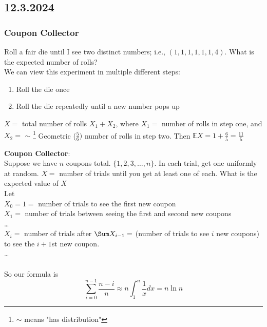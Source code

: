 \documentclass[11pt]{scrartcl}
\begin{document}
\subsection{12.3.2024}
\subsubsection{Coupon Collector}
\begin{example}
    Roll a fair die until I see two distinct numbers; i.e., $(1, 1, 1, 1, 1, 1, 4)$. What is the expected number of rolls? \\
    \noindent
    We can view this experiment in multiple different steps: \begin{enumerate}
        \item Roll the die once
        \item Roll the die repeatedly until a new number pops up
    \end{enumerate}
    $X = $ total number of rolls $ X_1 + X_2$, where $X_1=$ number of rolls in step one, and $X_2= $ $\sim$ \footnote{$\sim$ means "has distribution"} Geometric ($\frac{5}{6})$ number of rolls in step two. Then $\mathbb{E}X = 1 + \frac{6}{5} = \frac{11}{5}$  
\end{example}
\textbf{Coupon Collector}:\\
Suppose we have $n$ coupons total. $\{1, 2, 3, \dots, n\}$. In each trial, get one uniformly at random. $X =$ number of trials until you get at least one of each.  What is the expected value of $X$\\
Let \\
$X_0 = 1 =$ number of trials to see the first new coupon \\
$X_1 = $ number of trials between seeing the first and second new coupons\\
\dots \\
$X_i = $ number of trials after $\Sum X_{i-1} = $ (number of trials to see $i$ new coupons) to see the $i+1$st new coupon.\\
\dots\\
\\
So our formula is $$\sum_{i=0}^{n-1} \frac{n-i}{n} \approx n\int_1^n\frac{1}{x}dx = n \ln n$$
\end{document}
